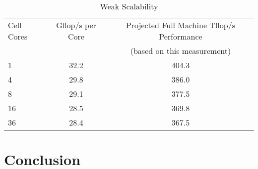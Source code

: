 \documentclass[10pt]{article}
\begin{document}
\begin{table}
\caption{\label{tbl:ASDS_Weak_Scalability}
Weak Scalability}

\begin{center}
\begin{tabular}{l c c}
\hline
\hline
Cell Cores & Gflop/s per Core & Projected Full Machine Tflop/s Performance \\
 & & (based on this measurement) \\
\hline
1 & 32.2 & 404.3 \\
4 & 29.8 & 386.0 \\
8 & 29.1 & 377.5 \\
16 & 28.5 & 369.8 \\
36 & 28.4 & 367.5 \\
\hline
\end{tabular}
\end{center}
\end{table}

%
%
%
%
%

\section{Conclusion}
\end{document}
